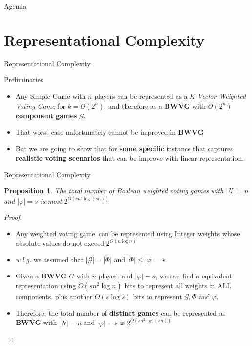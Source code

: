 \documentclass{beamer}
\begin{document}
\begin{frame}[fragile]{Agenda}
  \section{Representational Complexity}
  \tableofcontents[currentsection]
\end{frame}

\begin{frame}[fragile]{Representational Complexity}
  \begin{block}{Preliminaries}
    \begin{itemize}
      \item Any Simple Game with $n$ players can be represented as a \textit{K-Vector Weighted Voting Game}
      for $k = O(2^n)$, and therefore as a \textbf{BWVG} with $O(2^n)$ \textbf{component games} $\mathcal{G}$.
      \item That worst-case unfortunately cannot be improved in \textbf{BWVG}
      \item But we are going to show that for \textbf{some specific} instance that captures \textbf{realistic voting scenarios} that can be improve with linear representation.
    \end{itemize}
  \end{block}
\end{frame}

\begin{frame}[fragile]{Representational Complexity}
  \newtheorem{prop1}{Proposition}
  \begin{prop1}
    The total number of Boolean weighted voting games with $|N| = n$ and $|\varphi| = s$ is
    most $2^{O(sn^2 \log(sn))}$
  \end{prop1}
  \begin{proof}
    \begin{itemize}
      \item Any weighted voting game\footnotemark\ can be represented using Integer weights whose absolute values do not exceed $2^{O(n \log{n})}$
      \item \textit{w.l.g.} we assumed that $|\mathcal{G}| = |\Phi|$ and $|\Phi| \leq |\varphi| = s$
      \item Given a \textbf{BWVG} $G$ with $n$ players and $|\varphi| = s$, we can find a equivalent representation using $O(sn^2 \log{n})$
      bits to represent all weights in ALL components, plus another $O(s \log{s})$ bits to represent $\mathcal{G}, \Phi$ and $\varphi$.
      \item Therefore, the total number of \textbf{distinct games} can be represented as \textbf{BWVG} with $|N| = n$ and $|\varphi| = s$ is
      $2^{O(sn^2 \log(sn))}$
    \end{itemize}
  \end{proof}
\end{frame}
\end{document}
